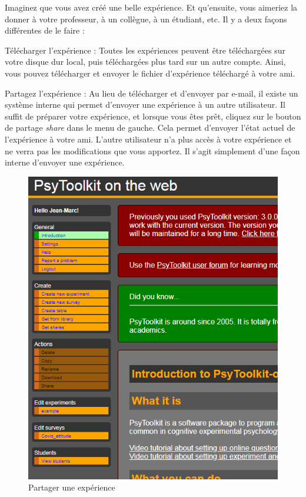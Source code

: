 \documentclass[
]{book}
\begin{document}
Imaginez que vous avez créé une belle expérience. Et qu'ensuite, vous
aimeriez la donner à votre professeur, à un collègue, à un étudiant,
etc. Il y a deux façons différentes de le faire :

Télécharger l'expérience : Toutes les expériences peuvent être
téléchargées sur votre disque dur local, puis téléchargées plus tard sur
un autre compte. Ainsi, vous pouvez télécharger et envoyer le fichier
d'expérience téléchargé à votre ami.

Partagez l'expérience : Au lieu de télécharger et d'envoyer par e-mail,
il existe un système interne qui permet d'envoyer une expérience à un
autre utilisateur. Il suffit de préparer votre expérience, et lorsque
vous êtes prêt, cliquez sur le bouton de partage \emph{share} dans le
menu de gauche. Cela permet d'envoyer l'état actuel de l'expérience à
votre ami. L'autre utilisateur n'a plus accès à votre expérience et ne
verra pas les modifications que vous apportez. Il s'agit simplement
d'une façon interne d'envoyer une expérience.

\begin{figure}
\centering
\includegraphics{img/share_experiment.PNG}
\caption{Partager une expérience}
\end{figure}
\end{document}
